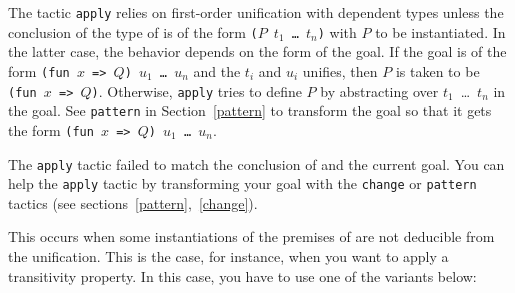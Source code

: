 The tactic {\tt apply} relies on first-order unification with
dependent types unless the conclusion of the type of {\term} is of the
form {\tt ($P$ $t_1$ \dots\ $t_n$)} with $P$ to be instantiated.  In
the latter case, the behavior depends on the form of the goal. If the
goal is of the form {\tt (fun $x$ => $Q$)~$u_1$~\ldots~$u_n$} and the
$t_i$ and $u_i$ unifies, then $P$ is taken to be {\tt (fun $x$ => $Q$)}.
Otherwise, {\tt apply} tries to define $P$ by abstracting over
$t_1$~\ldots ~$t_n$ in the goal. See {\tt pattern} in
Section~\ref{pattern} to transform the goal so that it gets the form
{\tt (fun $x$ => $Q$)~$u_1$~\ldots~$u_n$}.

\begin{ErrMsgs}
\item {}

  The {\tt apply}
  tactic failed to match the conclusion of {\term} and the current goal.
  You can help the {\tt apply} tactic by transforming your
  goal with the {\tt change} or {\tt pattern} tactics (see
  sections~\ref{pattern},~\ref{change}).

\item {}

  This occurs when some instantiations of the premises of {\term} are not
  deducible from the unification. This is the case, for instance, when
  you want to apply a transitivity property. In this case, you have to
  use one of the variants below:

\end{ErrMsgs}

